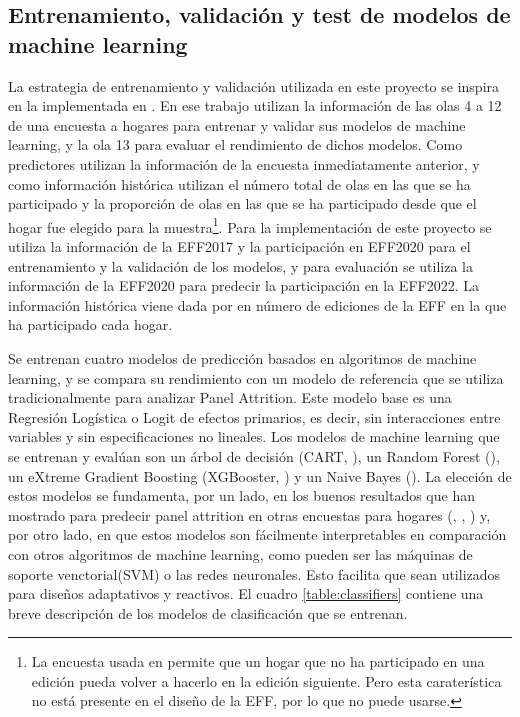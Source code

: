 \subsection*{Entrenamiento, validación y test de modelos de machine learning}

La estrategia de entrenamiento y validación utilizada en este proyecto se inspira en la implementada en \cite{beste2023case}. En ese trabajo utilizan la información de las olas 4 a 12 de una encuesta a hogares para entrenar y validar sus modelos de machine learning, y la ola 13 para evaluar el rendimiento de dichos modelos. Como predictores utilizan la información de la encuesta inmediatamente anterior, y como información histórica utilizan el número total de olas en las que se ha participado y la proporción de olas en las que se ha participado desde que el hogar fue elegido para la muestra\footnote{La encuesta usada en \cite{beste2023case} permite que un hogar que no ha participado en una edición pueda volver a hacerlo en la edición siguiente. Pero esta caraterística no está presente en el diseño de la EFF, por lo que no puede usarse.}. Para la implementación de este proyecto se utiliza la información de la EFF2017 y la participación en EFF2020 para el entrenamiento y la validación de los modelos, y para evaluación se utiliza la información de la EFF2020 para predecir la participación en la EFF2022. La información histórica viene dada por en número de ediciones de la EFF en la que ha participado cada hogar.

Se entrenan cuatro modelos de predicción basados en algoritmos de machine learning, y se compara su rendimiento con un modelo de referencia que se utiliza tradicionalmente para analizar Panel Attrition. Este modelo base es una Regresión Logística o Logit de efectos primarios, es decir, sin interacciones entre variables y sin especificaciones no lineales. Los modelos de machine learning que se entrenan y evalúan son un árbol de decisión (CART, \cite{breiman1984cart}), un Random Forest (\cite{breiman2001random}), un eXtreme Gradient Boosting (XGBooster, \cite{chen2016xgboost}) y un Naive Bayes (\cite{webb2010naive}). La elección de estos modelos se fundamenta, por un lado, en los buenos resultados que han mostrado para predecir panel attrition en otras encuestas para hogares (\cite{kern2019tree}, \cite{kern2021predicting}, \cite{beste2023case}) y, por otro lado, en que estos modelos son fácilmente interpretables en comparación con otros algoritmos de machine learning, como pueden ser las máquinas de soporte venctorial(SVM) o las redes neuronales. Esto facilita que sean utilizados para diseños adaptativos y reactivos. El cuadro \ref{table:classifiers} contiene una breve descripción de los modelos de clasificación que se entrenan.


